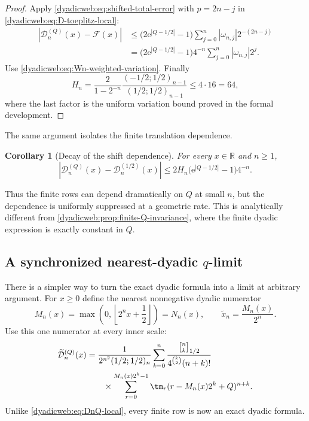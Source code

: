 \documentclass[11pt,oneside]{article}
\newtheorem{corollary}[theorem]{Corollary}
\theoremstyle{definition}
\theoremstyle{remark}
\newcommand{\R}{\mathbb R}
\newcommand{\e}{\mathrm e}
\newcommand{\qbinom}[3]{\genfrac{[}{]}{0pt}{}{#1}{#2}_{#3}}
\begin{document}
\begin{proof}
Apply \eqref{dyadicweb:eq:shifted-total-error} with $p=2n-j$ in
\eqref{dyadicweb:eq:D-toeplitz-local}:
\begin{align*}
 |\mathcal D_n^{(Q)}(x)-\mathcal F(x)|
 &\le\bigl(2\e^{|Q-1/2|}-1\bigr)
 \sum_{j=0}^{n}|\omega_{n,j}|2^{-(2n-j)}\\
 &=\bigl(2\e^{|Q-1/2|}-1\bigr)4^{-n}
 \sum_{j=0}^{n}|\omega_{n,j}|2^j.
\end{align*}
Use \eqref{dyadicweb:eq:Wn-weighted-variation}.  Finally
\[
 H_n
 =\frac{2}{1-2^{-n}}
   \frac{(-1/2;1/2)_{n-1}}{(1/2;1/2)_{n-1}}
 \le4\cdot16=64,
\]
where the last factor is the uniform variation bound proved in the formal development.
\end{proof}

The same argument isolates the finite translation dependence.

\begin{corollary}[Decay of the shift dependence]
\label{dyadicweb:cor:D-Q-decay}
For every $x\in\R$ and $n\ge1$,
\begin{equation}
 |\mathcal D_n^{(Q)}(x)-\mathcal D_n^{(1/2)}(x)|
 \le2H_n\bigl(\e^{|Q-1/2|}-1\bigr)4^{-n}.                \label{dyadicweb:eq:D-Q-decay}
\end{equation}
\end{corollary}

Thus the finite rows can depend dramatically on $Q$ at small $n$, but the dependence is
uniformly suppressed at a geometric rate.  This is analytically different from
\cref{dyadicweb:prop:finite-Q-invariance}, where the finite dyadic expression is exactly constant in
$Q$.

\subsection[A synchronized nearest-dyadic q-limit]{A synchronized nearest-dyadic $q$-limit}
\label{dyadicweb:subsec:synchronized}

There is a simpler way to turn the exact dyadic formula into a limit at arbitrary argument.
For $x\ge0$ define the nearest nonnegative dyadic numerator
\begin{equation}
 M_n(x)=\max\!\left(0,\left\lfloor2^nx+\frac12\right\rfloor\right)=N_n(x),
 \qquad
 \widetilde x_n=\frac{M_n(x)}{2^n}.                        \label{dyadicweb:eq:nearest-dyadic}
\end{equation}
Use this one numerator at every inner scale:
\begin{align}
 \widetilde{\mathcal D}_n^{(Q)}(x)
 &=\frac1{2^{n^2}(1/2;1/2)_n}
 \sum_{k=0}^{n}
 \frac{\qbinom nk{1/2}}{4^{\binom k2}(n+k)!}             \notag\\
 &\qquad\times
 \sum_{r=0}^{M_n(x)2^k-1}\tm_r
       (r-M_n(x)2^k+Q)^{n+k}.                             \label{dyadicweb:eq:synchronized-D}
\end{align}
Unlike \eqref{dyadicweb:eq:DnQ-local}, every finite row is now an exact dyadic formula.
\end{document}
